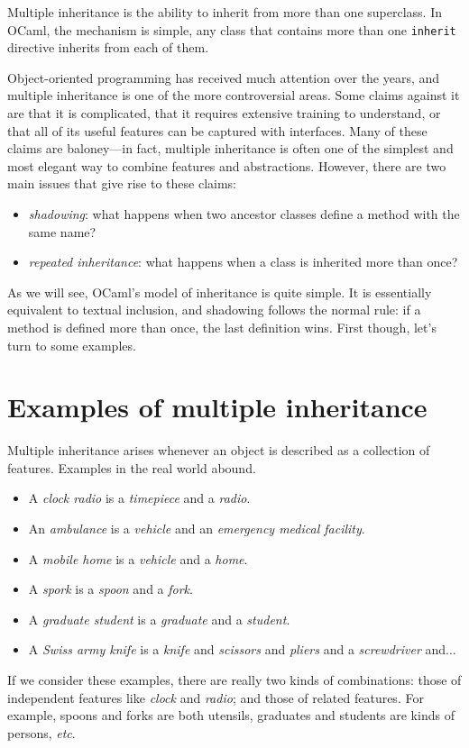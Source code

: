 
Multiple inheritance is the ability to inherit from more than one superclass.  In OCaml, the
mechanism is simple, any class that contains more than one \hbox{\lstinline/inherit/} directive inherits
from each of them.

Object-oriented programming has received much attention over the years, and multiple inheritance is
one of the more controversial areas.  Some claims against it are that it is complicated, that it
requires extensive training to understand, or that all of its useful features can be captured with
interfaces.  Many of these claims are baloney---in fact, multiple inheritance is often one of the
simplest and most elegant way to combine features and abstractions.  However, there are two main
issues that give rise to these claims:

\begin{itemize}
\item \emph{shadowing}: what happens when two ancestor classes define a method with the same name?
\item \emph{repeated inheritance}: what happens when a class is inherited more than once?
\end{itemize}
%
As we will see, OCaml's model of inheritance is quite simple.  It is essentially equivalent to
textual inclusion, and shadowing follows the normal rule: if a method is defined more than once, the
last definition wins.  First though, let's turn to some examples.

\section{Examples of multiple inheritance}

Multiple inheritance arises whenever an object is described as a collection of features.  Examples
in the real world abound.

\begin{itemize}
\item A \emph{clock radio} is a \emph{timepiece} and a \emph{radio}.
\item An \emph{ambulance} is a \emph{vehicle} and an \emph{emergency medical facility}.
\item A \emph{mobile home} is a \emph{vehicle} and a \emph{home}.
\item A \emph{spork} is a \emph{spoon} and a \emph{fork}.
\item A \emph{graduate student} is a \emph{graduate} and a \emph{student}.
\item A \emph{Swiss army knife} is a \emph{knife} and \emph{scissors} and \emph{pliers} and a \emph{screwdriver} and...
\end{itemize}
%
If we consider these examples, there are really two kinds of combinations: those of independent
features like \emph{clock} and \emph{radio}; and those of related features.  For example, spoons and forks are
both utensils, graduates and students are kinds of persons, \emph{etc}.

